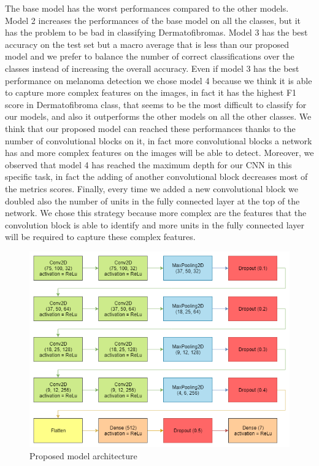 		The base model has the worst performances compared to the other models. Model 2 increases the performances of the base model on all the classes, but it has the problem to be bad in classifying Dermatofibromas.
		Model 3 has the best accuracy on the test set but a macro average that is less than our proposed model and we prefer to balance the number of correct classifications over the classes instead of increasing the overall accuracy. 
		Even if model 3 has the best performance on melanoma detection we chose model 4 because we think it is able to capture more complex features on the images, in fact it has the highest F1 score in Dermatofibroma class, that seems to be the most difficult to classify for our models, and also it outperforms the other models on all the other classes. We think that our proposed model can reached these performances thanks to the number of convolutional blocks on it, in fact more convolutional blocks a network has and more complex features on the images will be able to detect. Moreover, we observed that model 4 has reached the maximum depth for our CNN in this specific task, in fact the adding of another convolutional block decreases most of the metrics scores.
		Finally, every time we added a new convolutional block we doubled also the number of units in the fully connected layer at the top of the network. We chose this strategy because more complex are the features that the convolution block is able to identify and more units in the fully connected layer will be required to capture these complex features.
		
		\begin{figure}[H]
			\centering
			\includegraphics[width=15cm]{images/proposed_model.png}
			\caption{Proposed model architecture}
			\label{fig:proposed_model}
		\end{figure}
		
